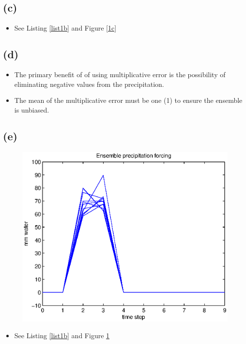 \documentclass[letterpaper]{tufte-handout}
\begin{document}
  \subsection{(c)}
  \begin{itemize}
    \item See Listing \ref{list1b} and Figure \ref{1c}
  \end{itemize}
  \subsection{(d)}
  \begin{itemize}
    \item The primary benefit of of using multiplicative error is the possibility of eliminating negative values from the precipitation.
    \item The mean of the multiplicative error must be one (1) to ensure the ensemble is unbiased.
  \end{itemize}
  \subsection{(e)}
  \begin{figure}
    \includegraphics[width=\textwidth]{1e}
    \label{1e}
  \end{figure}
  \begin{itemize}
    \item See Listing \ref{list1b} and Figure \ref{1e}
  \end{itemize}
\end{document}
